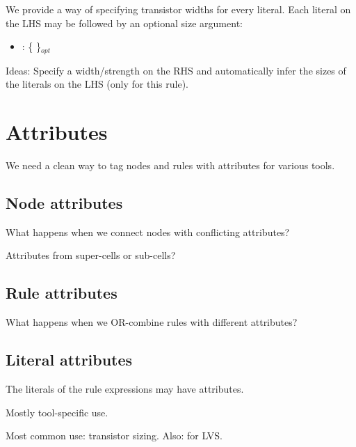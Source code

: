 We provide a way of specifying transistor widths for every literal.  
Each literal on the LHS may be followed by an optional size argument:

\begin{itemize}
\item {} :
	 \{ \ttt{<}  \ttt{>} \}$_{opt}$
\end{itemize}

Ideas: Specify a width/strength on the RHS and automatically infer
the sizes of the literals on the LHS (only for this rule).  

\section{Attributes}
\label{sec:prs:attrib}

We need a clean way to tag nodes and rules with attributes
for various tools.  

\subsection{Node attributes}
\label{sec:prs:attrib:node}

What happens when we connect nodes with conflicting attributes?

Attributes from super-cells or sub-cells?

\subsection{Rule attributes}
\label{sec:prs:attrib:rule}

What happens when we OR-combine rules with different attributes?

\subsection{Literal attributes}
\label{sec:prs:attrib:literal}

The literals of the rule expressions may have attributes.  

Mostly tool-specific use.

Most common use: transistor sizing.  
Also: for LVS.  

